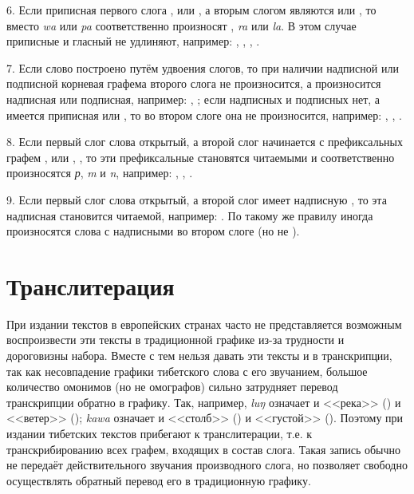 6. Если приписная первого слога ,  или , а вторым слогом являются  или , то вместо \textit{wa} или \textit{pa} соответственно произносят \textrtailn{}, \textit{ra} или \textit{la}. В этом случае приписные  и гласный не удлиняют, например:
,
,
,
.

7.	Если слово построено путём удвоения слогов, то при наличии надписной или подписной корневая графема второго слога не произносится, а произносится надписная или подписная, например:
, 
;
если надписных и подписных нет, а имеется приписная  или , то во втором слоге она не произносится, например:
,
,
.

8. Если первый слог слова открытый, а второй слог начинается с префиксальных графем ,  или , , то эти префиксальные становятся читаемыми и соответственно произносятся \textit{р}, \textit{m} и \textit{n}, например:
,
,
.

9. Если первый слог слова открытый, а второй слог имеет надписную , то эта надписная становится читаемой, например: . По такому же правилу иногда произносятся слова с надписными  во втором слоге (но не ).

\section{Транслитерация}

При издании текстов в европейских странах часто не представляется возможным воспроизвести эти тексты в традиционной графике из-за трудности и дороговизны набора. Вместе с тем нельзя давать эти тексты и в транскрипции, так как несовпадение графики тибетского слова с его звучанием, большое количество омонимов (но не омографов) сильно затрудняет перевод транскрипции обратно в графику. Так, например, \textit{lu{\unifont ŋ}\toneR} означает и <<река>> () и <<ветер>> (); \textit{ka\toneR{}wa\toneR} означает и <<столб>> () и <<густой>> (). Поэтому при издании тибетских текстов прибегают к транслитерации, т.е. к транскрибированию всех графем, входящих в состав слога. Такая запись обычно не передаёт действительного звучания производного слога, но позволяет свободно осуществлять обратный перевод его в традиционную графику.

